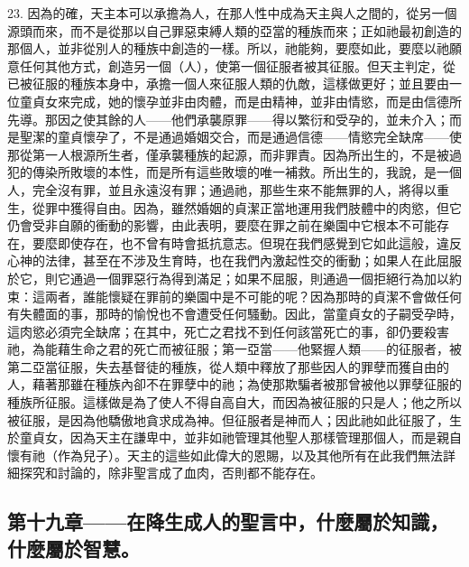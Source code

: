 23. 因為的確，天主本可以承擔為人，在那人性中成為天主與人之間的，從另一個源頭而來，而不是從那以自己罪惡束縛人類的亞當的種族而來；正如祂最初創造的那個人，並非從別人的種族中創造的一樣。所以，祂能夠，要麼如此，要麼以祂願意任何其他方式，創造另一個（人），使第一個征服者被其征服。但天主判定，從已被征服的種族本身中，承擔一個人來征服人類的仇敵，這樣做更好；並且要由一位童貞女來完成，她的懷孕並非由肉體，而是由精神，並非由情慾，而是由信德所先導。那因之使其餘的人——他們承襲原罪——得以繁衍和受孕的，並未介入；而是聖潔的童貞懷孕了，不是通過婚姻交合，而是通過信德——情慾完全缺席——使那從第一人根源所生者，僅承襲種族的起源，而非罪責。因為所出生的，不是被過犯的傳染所敗壞的本性，而是所有這些敗壞的唯一補救。所出生的，我說，是一個人，完全沒有罪，並且永遠沒有罪；通過祂，那些生來不能無罪的人，將得以重生，從罪中獲得自由。因為，雖然婚姻的貞潔正當地運用我們肢體中的肉慾，但它仍會受非自願的衝動的影響，由此表明，要麼在罪之前在樂園中它根本不可能存在，要麼即使存在，也不曾有時會抵抗意志。但現在我們感覺到它如此這般，違反心神的法律，甚至在不涉及生育時，也在我們內激起性交的衝動；如果人在此屈服於它，則它通過一個罪惡行為得到滿足；如果不屈服，則通過一個拒絕行為加以約束：這兩者，誰能懷疑在罪前的樂園中是不可能的呢？因為那時的貞潔不會做任何有失體面的事，那時的愉悅也不會遭受任何騷動。因此，當童貞女的子嗣受孕時，這肉慾必須完全缺席；在其中，死亡之君找不到任何該當死亡的事，卻仍要殺害祂，為能藉生命之君的死亡而被征服；第一亞當——他緊握人類——的征服者，被第二亞當征服，失去基督徒的種族，從人類中釋放了那些因人的罪孽而獲自由的人，藉著那雖在種族內卻不在罪孽中的祂；為使那欺騙者被那曾被他以罪孽征服的種族所征服。這樣做是為了使人不得自高自大，而因為被征服的只是人；他之所以被征服，是因為他驕傲地貪求成為神。但征服者是神而人；因此祂如此征服了，生於童貞女，因為天主在謙卑中，並非如祂管理其他聖人那樣管理那個人，而是親自懷有祂（作為兒子）。天主的這些如此偉大的恩賜，以及其他所有在此我們無法詳細探究和討論的，除非聖言成了血肉，否則都不能存在。\par


\subsection{第十九章——在降生成人的聖言中，什麼屬於知識，什麼屬於智慧。}

